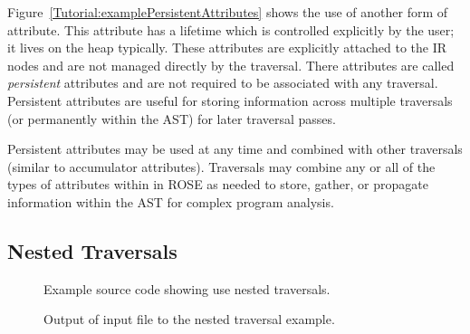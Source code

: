      Figure~\ref{Tutorial:examplePersistentAttributes} shows the use of
another form of attribute.  This attribute has a lifetime which is controlled explicitly
by the user; it lives on the heap typically.  These attributes are explicitly attached to 
the IR nodes and are not managed directly by the traversal.  There attributes are
called {\em persistent} attributes and are not required to be associated with any
traversal.  Persistent attributes are useful for storing information across multiple
traversals (or permanently within the AST) for later traversal passes.  

   Persistent attributes may be used at any time and combined with other traversals
(similar to accumulator attributes).  Traversals may combine any or all of the
types of attributes within in ROSE as needed to store, gather, or propagate
information within the AST for complex program analysis.







\clearpage
\subsection{Nested Traversals}

\begin{figure}[!h]
{\indent
{\mySmallFontSize


\begin{latexonly}
   
\end{latexonly}

\begin{htmlonly}
   
\end{htmlonly}

}
}
\caption{Example source code showing use nested traversals.}
\label{Tutorial:exampleNestedTraversal}
\end{figure}


\begin{figure}[!h]
{\indent
{\mySmallFontSize

\begin{latexonly}
   
\end{latexonly}

\begin{htmlonly}
   
\end{htmlonly}

}
}
\caption{Output of input file to the nested traversal example.}
\label{Tutorial:exampleOutput_NestedTraversal}
\end{figure}

